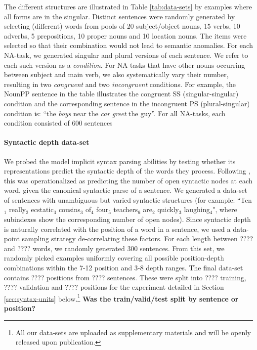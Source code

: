 The different structures are illustrated in Table \ref{tab:data-sets}
by examples where all forms are in the singular. Distinct sentences
were randomly generated by selecting (different) words from pools of
20 subject/object nouns, 15 verbs, 10 adverbs, 5 prepositions, 10
proper nouns and 10 location nouns. The items were selected so that
their combination would not lead to semantic anomalies. For each
NA-task, we generated singular and plural versions of each
sentence. We refer to each such version as a \textit{condition}. For
NA-tasks that have other nouns occurring between subject and main
verb, we also systematically vary their number, resulting in two
\textit{congruent} and two \textit{incongruent} conditions. For example, the NounPP
sentence in the table illustrates the congruent SS (singular-singular)
condition and the corresponding sentence in the incongruent PS (plural-singular)
condition is: ``the \emph{boys} near the \emph{car} \emph{greet} the guy''. For all
NA-tasks, each condition consisted of 600 sentences

\paragraph{Syntactic depth data-set} We probed the model implicit
syntax parsing abilities by testing whether its representations
predict the syntactic depth of the words they process. Following
, this was operationalized as predicting the
number of open syntactic nodes at each word, given the canonical
syntactic parse of a sentence.  We generated a data-set of sentences with
unambiguous but varied syntactic structures (for example:
``Ten$_1$ really$_2$ ecstatic$_3$ cousins$_3$ of$_4$ four$_5$ teachers$_6$
are$_2$ quickly$_3$ laughing$_4$", where subindexes show the corresponding
number of open nodes).
Since syntactic depth is
naturally correlated with the position of a word in a sentence, we
used a data-point sampling strategy de-correlating these factors. For
each length between ????  and ???? words, we randomly generated 300
sentences. From this set, we randomly picked examples uniformly
covering all possible position-depth combinations within the 7-12
position and 3-8 depth ranges.  The final data-set contains ????
positions from ???? sentences. These were split into ???? training,
???? validation and ???? positions for the experiment detailed in
Section \ref{sec:syntax-units} below.\footnote{All our data-sets are
  uploaded as supplementary materials and will be openly released upon
  publication.} \textbf{Was the train/valid/test split by sentence or
  position?}

